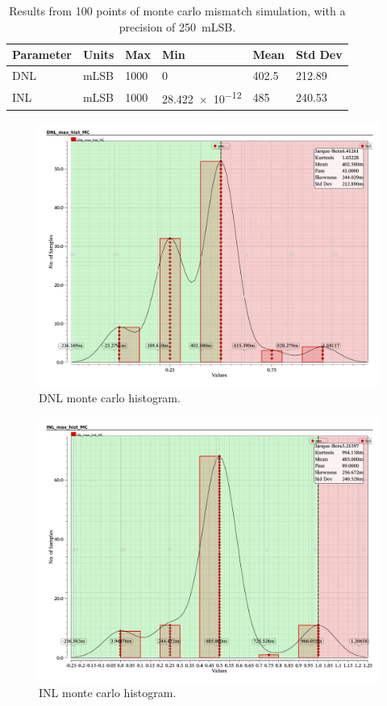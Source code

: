 \documentclass[11pt,letterpaper]{article}
\begin{document}
\begin{table}[htbp!]
    \centering
    \begin{tabular}{llllll}
    \toprule
        \textbf{Parameter} & \textbf{Units} & \textbf{Max} & \textbf{Min} & \textbf{Mean} & \textbf{Std Dev} \\
    \midrule
        DNL & mLSB & 1000 & 0 & 402.5 & 212.89 \\
        INL & mLSB & 1000 & \qty{28.422e-12}{} & 485 & 240.53 \\
    \bottomrule
    \end{tabular}
    \caption{Results from 100 points of monte carlo mismatch simulation, with a precision of \qty{250}{mLSB}.}\label{tab:mc_results}
\end{table}

\begin{figure}[htbp!]
		\centering
	    \includegraphics[width=\textwidth]{images/DNL_mc_hist.pdf}
		\caption{DNL monte carlo histogram.}\label{fig:dnl_hist}
\end{figure}

\begin{figure}[htbp!]
		\centering
	    \includegraphics[width=\textwidth]{images/INL_mc_hist.pdf}
		\caption{INL monte carlo histogram.}\label{fig:inl_hist}
\end{figure}
\end{document}
